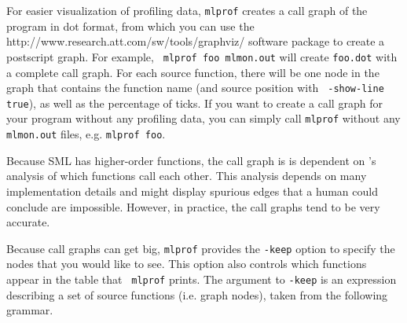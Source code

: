 For easier visualization of profiling data, {\tt mlprof} creates a
call graph of the program in dot format, from which you can use the
		  {http://www.research.att.com/sw/tools/graphviz/}
software package to create a postscript graph.  For example, {\tt
mlprof foo mlmon.out} will create {\tt foo.dot} with a complete call
graph.  For each source function, there will be one node in the graph
that contains the function name (and source position with {\tt
-show-line true}), as well as the percentage of ticks.  If you want to
create a call graph for your program without any profiling data, you
can simply call {\tt mlprof} without any {\tt mlmon.out} files,
e.g. {\tt mlprof foo}.

Because SML has higher-order functions, the call graph is is dependent
on {\mlton}'s analysis of which functions call each other.  This
analysis depends on many implementation details and might display
spurious edges that a human could conclude are impossible.  However,
in practice, the call graphs tend to be very accurate.

Because call graphs can get big, {\tt mlprof} provides the {\tt -keep}
option to specify the nodes that you would like to see.  This
option also controls which functions appear in the table that {\tt
mlprof} prints.  The argument to {\tt -keep} is an expression
describing a set of source functions (i.e. graph nodes), taken from
the following grammar.

